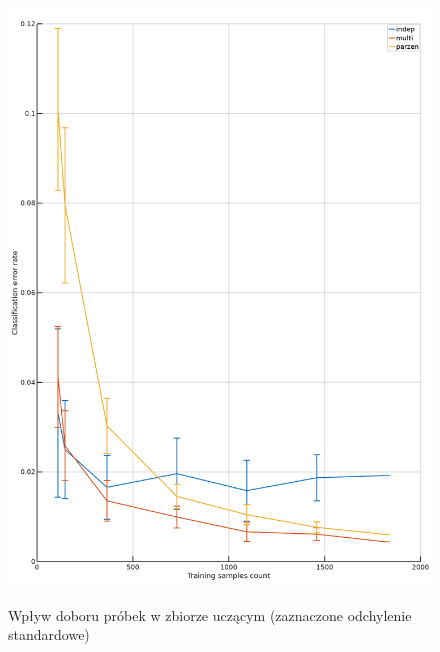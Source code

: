 \documentclass[a4paper]{article}
\begin{document}
\begin{figure}[h]
    \caption[]{Wpływ doboru próbek w zbiorze uczącym (zaznaczone odchylenie standardowe)}
    \centering
    \includegraphics[width=1.0\textwidth]{reduce.png}
    \label{fig:reduce1}
\end{figure}
\end{document}

